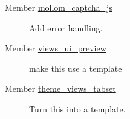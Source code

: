 \label{todo__todo000006}
\hypertarget{todo__todo000006}{}
 \begin{description}
\item[Member \hyperlink{mollom_8pages_8inc_4cce4473bb53417b30e6858a4f746d70}{mollom\_\-captcha\_\-js} ]Add error handling. \end{description}


\label{todo__todo000007}
\hypertarget{todo__todo000007}{}
 \begin{description}
\item[Member \hyperlink{admin_8inc_82e72453c3ff3f251677786b58bb66ec}{views\_\-ui\_\-preview} ]make this use a template \end{description}


\label{todo__todo000009}
\hypertarget{todo__todo000009}{}
 \begin{description}
\item[Member \hyperlink{tabs_8inc_205d52e785fc290ec3769378d2ee0ece}{theme\_\-views\_\-tabset} ]Turn this into a template. \end{description}
